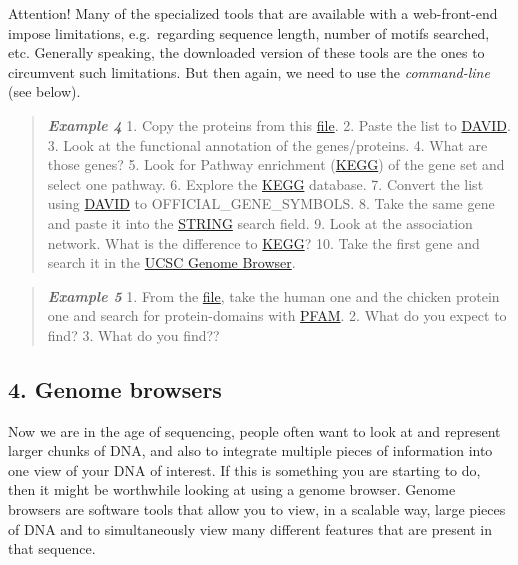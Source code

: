 \documentclass[]{article}
\begin{document}
Attention! Many of the specialized tools that are available with a
web-front-end impose limitations, e.g.~regarding sequence length, number
of motifs searched, etc. Generally speaking, the downloaded version of
these tools are the ones to circumvent such limitations. But then again,
we need to use the \emph{command-line} (see below).

\begin{quote}
\emph{\textbf{Example 4}} 1. Copy the proteins from this
\href{http://compbio.massey.ac.nz/wiki/data/c1/gene_set.txt}{file}. 2.
Paste the list to \href{http://david.abcc.ncifcrf.gov/}{DAVID}. 3. Look
at the functional annotation of the genes/proteins. 4. What are those
genes? 5. Look for Pathway enrichment
(\href{http://www.genome.jp/kegg/}{KEGG}) of the gene set and select one
pathway. 6. Explore the \href{http://www.genome.jp/kegg/}{KEGG}
database. 7. Convert the list using
\href{http://david.abcc.ncifcrf.gov/}{DAVID} to OFFICIAL\_GENE\_SYMBOLS.
8. Take the same gene and paste it into the
\href{http://string-db.org/}{STRING} search field. 9. Look at the
association network. What is the difference to
\href{http://www.genome.jp/kegg/}{KEGG}? 10. Take the first gene and
search it in the \href{http://genome.ucsc.edu/}{UCSC Genome Browser}.
\end{quote}

\begin{quote}
\emph{\textbf{Example 5}} 1. From the
\href{http://compbio.massey.ac.nz/wiki/data/c1/BRCA2_aa.fasta}{file},
take the human one and the chicken protein one and search for
protein-domains with \href{http://pfam.xfam.org/}{PFAM}. 2. What do you
expect to find? 3. What do you find??
\end{quote}

\subsection{4. Genome browsers}\label{genome-browsers}

Now we are in the age of sequencing, people often want to look at and
represent larger chunks of DNA, and also to integrate multiple pieces of
information into one view of your DNA of interest. If this is something
you are starting to do, then it might be worthwhile looking at using a
genome browser. Genome browsers are software tools that allow you to
view, in a scalable way, large pieces of DNA and to simultaneously view
many different features that are present in that sequence.
\end{document}
